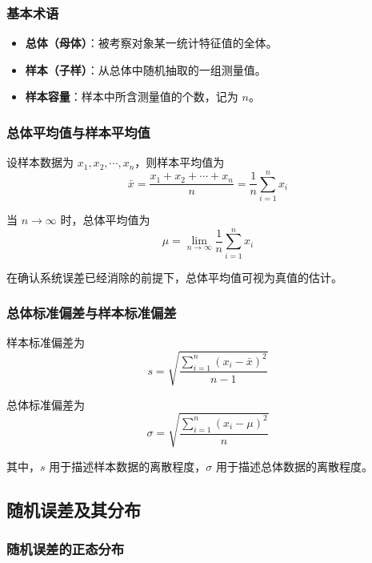 \documentclass[12pt,a4paper]{article}
\numberwithin{equation}{section}
\begin{document}
\subsubsection{基本术语}

\begin{itemize}
    \item \textbf{总体（母体）}：被考察对象某一统计特征值的全体。
    \item \textbf{样本（子样）}：从总体中随机抽取的一组测量值。
    \item \textbf{样本容量}：样本中所含测量值的个数，记为 $n$。
\end{itemize}

\subsubsection{总体平均值与样本平均值}

设样本数据为 $x_1,x_2,\cdots,x_n$，则样本平均值为
\begin{equation}
\bar{x}=\frac{x_1+x_2+\cdots+x_n}{n}=\frac{1}{n}\sum_{i=1}^{n}x_i
\end{equation}

当 $n\to\infty$ 时，总体平均值为
\begin{equation}
\mu=\lim_{n\to\infty}\frac{1}{n}\sum_{i=1}^{n}x_i
\end{equation}

在确认系统误差已经消除的前提下，总体平均值可视为真值的估计。

\subsubsection{总体标准偏差与样本标准偏差}

样本标准偏差为
\begin{equation}
s=\sqrt{\frac{\sum_{i=1}^{n}(x_i-\bar{x})^2}{n-1}}
\end{equation}

总体标准偏差为
\begin{equation}
\sigma=\sqrt{\frac{\sum_{i=1}^{n}(x_i-\mu)^2}{n}}
\end{equation}

其中，$s$ 用于描述样本数据的离散程度，$\sigma$ 用于描述总体数据的离散程度。

\subsection{随机误差及其分布}

\subsubsection{随机误差的正态分布}
\end{document}

